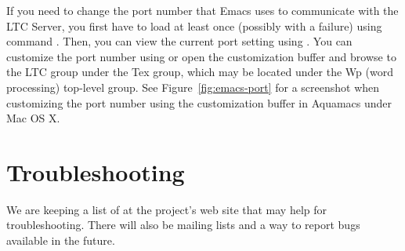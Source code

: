 If you need to change the port number that Emacs uses to communicate with the LTC Server, you first have to load  at least once (possibly with a failure) using command .  Then, you can view the current port setting using .  You can customize the port number using  or open the customization buffer and browse to the LTC group under the Tex group, which may be located under the Wp (word processing) top-level group.  See Figure~\ref{fig:emacs-port} for a screenshot when customizing the port number using the customization buffer in Aquamacs under Mac OS X.

%

\section{Troubleshooting}

We are keeping a list of  at the project's web site that may help for troubleshooting.  There will also be mailing lists and a way to report bugs available in the future.
